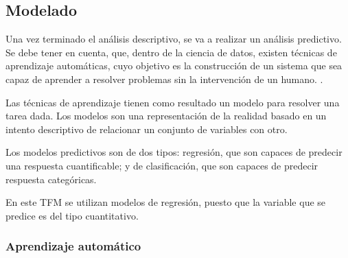 

\subsection{Modelado}
Una vez terminado el análisis descriptivo, se va a realizar un análisis predictivo. Se debe tener en cuenta, que, dentro de la ciencia de datos, existen técnicas de aprendizaje automáticas, cuyo objetivo es la construcción de un sistema que sea capaz de aprender a resolver problemas sin la intervención de un humano. \cite{MARIN2018}.

Las técnicas de aprendizaje tienen como resultado un modelo para resolver una tarea dada. Los modelos son una representación de la realidad basado en un intento descriptivo de relacionar un conjunto de variables con otro.

Los modelos predictivos son de dos tipos: regresión, que son capaces de predecir una respuesta cuantificable; y de clasificación, que son capaces de predecir respuesta categóricas.

En este TFM se utilizan modelos de regresión, puesto que la variable que se predice es del tipo cuantitativo.

\subsubsection{Aprendizaje automático}

